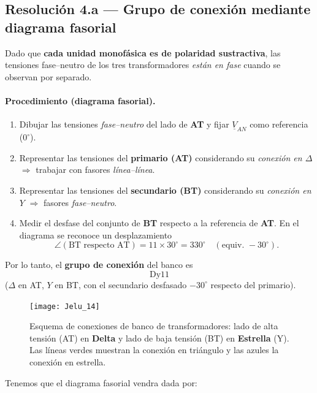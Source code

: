 \documentclass[
  11pt,
  letterpaper,
   addpoints,
  ]{exam}
\begin{document}
\begin{questions}
\begin{solution}
\subsection*{Resolución 4.a — Grupo de conexión mediante diagrama fasorial}

Dado que \textbf{cada unidad monofásica es de polaridad sustractiva}, las tensiones
fase–neutro de los tres transformadores \emph{están en fase} cuando se observan por separado.

\paragraph{Procedimiento (diagrama fasorial).}
\begin{enumerate}
  \item Dibujar las tensiones \emph{fase–neutro} del lado de \textbf{AT} y fijar
        \(\underline{V}_{AN}\) como referencia (\(0^\circ\)).
  \item Representar las tensiones del \textbf{primario (AT)} considerando su
        \emph{conexión en \(\Delta\)} \(\Rightarrow\) trabajar con fasores \emph{línea–línea}.
  \item Representar las tensiones del \textbf{secundario (BT)} considerando su
        \emph{conexión en \(Y\)} \(\Rightarrow\) fasores \emph{fase–neutro}.
  \item Medir el desfase del conjunto de \textbf{BT} respecto a la referencia de \textbf{AT}.
        En el diagrama se reconoce un desplazamiento
        \begin{equation}
            \angle(\text{BT respecto AT}) = 11 \times 30^\circ = 330^\circ
            \quad(\text{equiv. } -30^\circ).
        \end{equation}
\end{enumerate}

Por lo tanto, el \textbf{grupo de conexión} del banco es
\[
\boxed{\mathrm{Dy11}}
\]
(\(\Delta\) en AT, \(Y\) en BT, con el secundario desfasado \(-30^\circ\) respecto del primario).

\begin{figure}[H]
  \centering
  \texttt{[image: Jelu\_14]}
  \caption{Esquema de conexiones de banco de transformadores: lado de alta tensión (AT) en \textbf{Delta} y lado de baja tensión (BT) en \textbf{Estrella} (Y). Las líneas verdes muestran la conexión en triángulo y las azules la conexión en estrella.}
\end{figure}
Tenemos que el diagrama fasorial vendra dada por:



\end{solution}
\end{questions}
\end{document}
